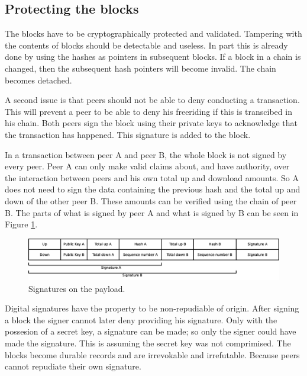 \subsection{Protecting the blocks}
\label{sect:repudiation}
The blocks have to be cryptographically protected and validated.
Tampering with the contents of blocks should be detectable and useless.
In part this is already done by using the hashes as pointers in subsequent blocks.
If a block in a chain is changed, then the subsequent hash pointers will become invalid\cite{VanderLubbe-crypto}.
The chain becomes detached.

A second issue is that peers should not be able to deny conducting a transaction.
This will prevent a peer to be able to deny his freeriding if this is transcibed in his chain.
Both peers sign the block using their private keys to acknowledge that the transaction has happened.
This signature is added to the block.

In a transaction between peer A and peer B, the whole block is not signed by every peer.
Peer A can only make valid claims about, and have authority, over the interaction between peers
and his own total up and download amounts.
So A does not need to sign the data containing the previous hash and the total up and down of the other peer B.
These amounts can be verified using the chain of peer B.
The parts of what is signed by peer A and what is signed by B can be seen in Figure \ref{fig:signatures}.
\begin{figure}
	\centerline{\includegraphics[scale=0.3]{design/figs/signatures.eps}}
	\caption{Signatures on the payload.}
	\label{fig:signatures}
\end{figure}

Digital signatures have the property to be non-repudiable of origin\cite{VanderLubbe-crypto}.
After signing a block the signer cannot later deny providing his signature.
Only with the possesion of a secret key,
a signature can be made;
so only the signer could have made the signature.
This is assuming the secret key was not comprimised.
The blocks become durable records and are irrevokable and irrefutable.
Because peers cannot repudiate their own signature.

